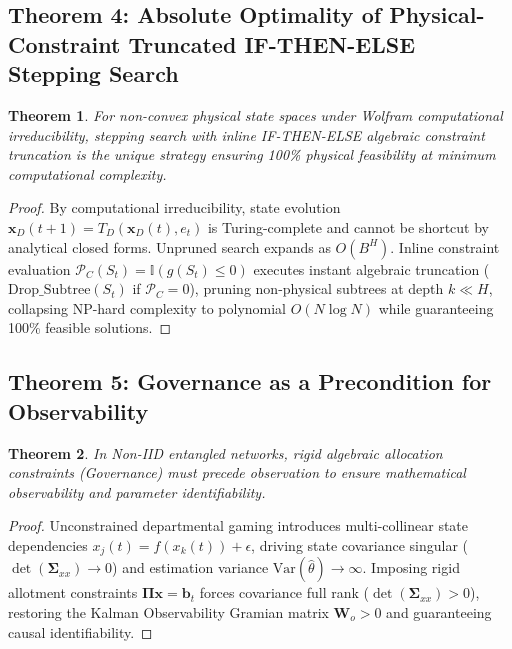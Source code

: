 \documentclass[11pt,a4paper]{article}
\newtheorem{theorem}{Theorem}[section]
\begin{document}
\subsection{Theorem 4: Absolute Optimality of Physical-Constraint Truncated IF-THEN-ELSE Stepping Search}

\begin{theorem}
For non-convex physical state spaces under Wolfram computational irreducibility, stepping search with inline IF-THEN-ELSE algebraic constraint truncation is the unique strategy ensuring 100\% physical feasibility at minimum computational complexity.
\end{theorem}

\begin{proof}
By computational irreducibility, state evolution $\mathbf{x}_D(t+1) = T_D(\mathbf{x}_D(t), e_t)$ is Turing-complete and cannot be shortcut by analytical closed forms. Unpruned search expands as $O(B^H)$. Inline constraint evaluation $\mathcal{P}_C(S_t) = \mathbb{I}(g(S_t) \le 0)$ executes instant algebraic truncation ($\text{Drop\_Subtree}(S_t)$ if $\mathcal{P}_C = 0$), pruning non-physical subtrees at depth $k \ll H$, collapsing NP-hard complexity to polynomial $O(N \log N)$ while guaranteeing 100\% feasible solutions.
\end{proof}

\subsection{Theorem 5: Governance as a Precondition for Observability}

\begin{theorem}
In Non-IID entangled networks, rigid algebraic allocation constraints (Governance) must precede observation to ensure mathematical observability and parameter identifiability.
\end{theorem}

\begin{proof}
Unconstrained departmental gaming introduces multi-collinear state dependencies $x_j(t) = f(x_k(t)) + \epsilon$, driving state covariance singular ($\det(\mathbf{\Sigma}_{xx}) \to 0$) and estimation variance $\text{Var}(\hat{\theta}) \to \infty$. Imposing rigid allotment constraints $\mathbf{\Pi}\mathbf{x} = \mathbf{b}_t$ forces covariance full rank ($\det(\mathbf{\Sigma}_{xx}) > 0$), restoring the Kalman Observability Gramian matrix $\mathbf{W}_o > 0$ and guaranteeing causal identifiability.
\end{proof}
\end{document}

